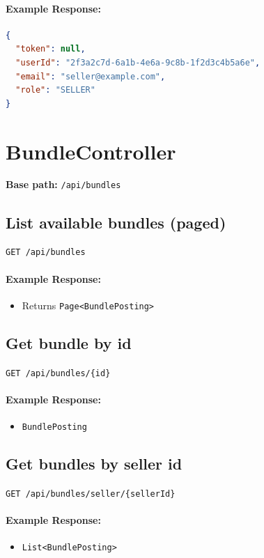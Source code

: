\documentclass[a4paper,11pt]{article}
\begin{document}
\paragraph{Example Response:}
\begin{lstlisting}[language=json]
{
  "token": null,
  "userId": "2f3a2c7d-6a1b-4e6a-9c8b-1f2d3c4b5a6e",
  "email": "seller@example.com",
  "role": "SELLER"
}
\end{lstlisting}

\hrulefill

\section{BundleController}
\textbf{Base path:} \texttt{/api/bundles}

\subsection{List available bundles (paged)}
\texttt{GET /api/bundles}

\paragraph{Example Response:}
\begin{itemize}
    \item Returns \texttt{Page<BundlePosting>}
\end{itemize}

\subsection{Get bundle by id}
\texttt{GET /api/bundles/\{id\}}

\paragraph{Example Response:}
\begin{itemize}
    \item \texttt{BundlePosting}
\end{itemize}

\subsection{Get bundles by seller id}
\texttt{GET /api/bundles/seller/\{sellerId\}}

\paragraph{Example Response:}
\begin{itemize}
    \item \texttt{List<BundlePosting>}
\end{itemize}
\end{document}

